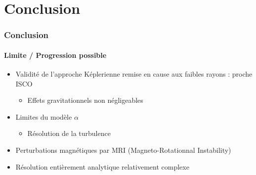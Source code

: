 \section{Conclusion}
\begin{frame}
\frametitle{Conclusion}
\framesubtitle{Limite / Progression possible}
	\begin{itemize}
		\item Validité de l'approche Képlerienne remise en cause aux faibles rayons : proche ISCO	
		\begin{itemize}
			\item Effets gravitationnels non négligeables
		\end{itemize}
		\item Limites du modèle $\alpha$
		\begin{itemize}
			\item Résolution de la turbulence
		\end{itemize}
		\item Perturbations magnétiques par MRI (Magneto-Rotationnal Instability)
		\item Résolution entièrement analytique relativement complexe
	\end{itemize}		
\end{frame}